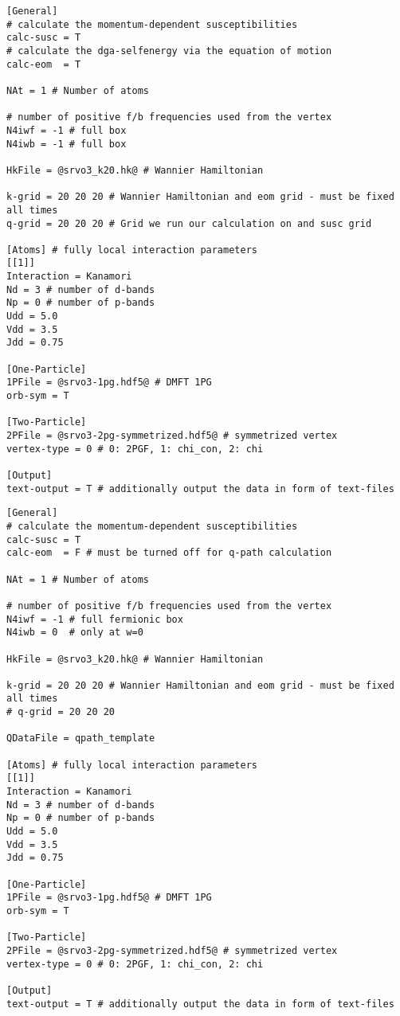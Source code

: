 \documentclass[a4paper,11pt]{article}
\numberwithin{equation}{section} %
\begin{document}
\newpage
\begin{lstlisting}[caption=config file for q-grid calculation, frame=single, basicstyle=\small, style=base2]
[General]
# calculate the momentum-dependent susceptibilities
calc-susc = T
# calculate the dga-selfenergy via the equation of motion
calc-eom  = T

NAt = 1 # Number of atoms

# number of positive f/b frequencies used from the vertex
N4iwf = -1 # full box
N4iwb = -1 # full box

HkFile = @srvo3_k20.hk@ # Wannier Hamiltonian

k-grid = 20 20 20 # Wannier Hamiltonian and eom grid - must be fixed all times
q-grid = 20 20 20 # Grid we run our calculation on and susc grid

[Atoms] # fully local interaction parameters
[[1]]
Interaction = Kanamori
Nd = 3 # number of d-bands
Np = 0 # number of p-bands
Udd = 5.0
Vdd = 3.5
Jdd = 0.75

[One-Particle]
1PFile = @srvo3-1pg.hdf5@ # DMFT 1PG
orb-sym = T

[Two-Particle]
2PFile = @srvo3-2pg-symmetrized.hdf5@ # symmetrized vertex
vertex-type = 0 # 0: 2PGF, 1: chi_con, 2: chi

[Output]
text-output = T # additionally output the data in form of text-files
\end{lstlisting}

\newpage
\begin{lstlisting}[caption=config file for q-path calculation, frame=single, basicstyle=\small, style=base2]
[General]
# calculate the momentum-dependent susceptibilities
calc-susc = T
calc-eom  = F # must be turned off for q-path calculation

NAt = 1 # Number of atoms

# number of positive f/b frequencies used from the vertex
N4iwf = -1 # full fermionic box
N4iwb = 0  # only at w=0

HkFile = @srvo3_k20.hk@ # Wannier Hamiltonian

k-grid = 20 20 20 # Wannier Hamiltonian and eom grid - must be fixed all times
# q-grid = 20 20 20

QDataFile = qpath_template

[Atoms] # fully local interaction parameters
[[1]]
Interaction = Kanamori
Nd = 3 # number of d-bands
Np = 0 # number of p-bands
Udd = 5.0
Vdd = 3.5
Jdd = 0.75

[One-Particle]
1PFile = @srvo3-1pg.hdf5@ # DMFT 1PG
orb-sym = T

[Two-Particle]
2PFile = @srvo3-2pg-symmetrized.hdf5@ # symmetrized vertex
vertex-type = 0 # 0: 2PGF, 1: chi_con, 2: chi

[Output]
text-output = T # additionally output the data in form of text-files
\end{lstlisting}
\newpage
\end{document}
